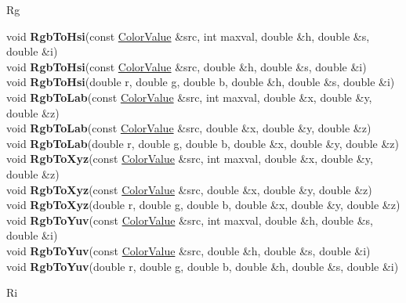 \documentclass[10pt,titlepage]{article}
\def\functionlistentry#1#2#3#4#5#6{\noindent #1 {\bf #2}(#3) \dotfill #6\\}
\def\letterref#1{}
\def\letterlabel#1{\vspace{0.5cm}\centerline{\Large #1}}
\def\letterlabelend#1{}
\begin{document}
{{\letterlabel{Rg}
\letterref{A}
\letterref{B}
\letterref{C}
\letterref{D}
\letterref{E}
\letterref{F}
\letterref{G}
\letterref{H}
\letterref{I}
\letterref{K}
\letterref{L}
\letterref{M}
\letterref{N}
\letterref{O}
\letterref{P}
\letterref{Q}
\letterref{R}
\letterref{S}
\letterref{T}
\letterref{U}
\letterref{V}
\letterref{W}
\letterref{X}
\letterref{Y}
\letterref{Z}

\letterref{Ra}
\letterref{Re}
\letterref{Rg}
\letterref{Ri}
\letterref{Ro}
\letterlabelend{Rg}
\functionlistentry{void}{RgbToHsi}{const \hyperlink{ColorValue}{ColorValue} \&src, int maxval, double \&h, double \&s, double \&i}{295}{datastructures}{}
\functionlistentry{void}{RgbToHsi}{const \hyperlink{ColorValue}{ColorValue} \&src, double \&h, double \&s, double \&i}{296}{datastructures}{}
\functionlistentry{void}{RgbToHsi}{double r, double g, double b, double \&h, double \&s, double \&i}{308}{datastructures}{}
\functionlistentry{void}{RgbToLab}{const \hyperlink{ColorValue}{ColorValue} \&src, int maxval, double \&x, double \&y, double \&z}{301}{datastructures}{}
\functionlistentry{void}{RgbToLab}{const \hyperlink{ColorValue}{ColorValue} \&src, double \&x, double \&y, double \&z}{302}{datastructures}{}
\functionlistentry{void}{RgbToLab}{double r, double g, double b, double \&x, double \&y, double \&z}{315}{datastructures}{}
\functionlistentry{void}{RgbToXyz}{const \hyperlink{ColorValue}{ColorValue} \&src, int maxval, double \&x, double \&y, double \&z}{299}{datastructures}{}
\functionlistentry{void}{RgbToXyz}{const \hyperlink{ColorValue}{ColorValue} \&src, double \&x, double \&y, double \&z}{300}{datastructures}{}
\functionlistentry{void}{RgbToXyz}{double r, double g, double b, double \&x, double \&y, double \&z}{311}{datastructures}{}
\functionlistentry{void}{RgbToYuv}{const \hyperlink{ColorValue}{ColorValue} \&src, int maxval, double \&h, double \&s, double \&i}{297}{datastructures}{}
\functionlistentry{void}{RgbToYuv}{const \hyperlink{ColorValue}{ColorValue} \&src, double \&h, double \&s, double \&i}{298}{datastructures}{}
\functionlistentry{void}{RgbToYuv}{double r, double g, double b, double \&h, double \&s, double \&i}{310}{datastructures}{}

\letterlabel{Ri}
\letterref{A}
\letterref{B}
\letterref{C}
\letterref{D}
\letterref{E}
\letterref{F}
\letterref{G}
\letterref{H}
\letterref{I}
\letterref{K}
\letterref{L}
\letterref{M}
\letterref{N}
\letterref{O}
\letterref{P}
\letterref{Q}
\letterref{R}
\letterref{S}
\letterref{T}
\letterref{U}
\letterref{V}
\letterref{W}
\letterref{X}
\letterref{Y}
\letterref{Z}

}}
\end{document}
